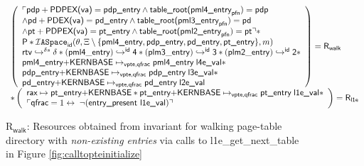 \begin{figure}\footnotesize
  \vspace{-1em}
$\begin{array}{l}\left( \begin{array}{l} \ulcorner \textsf{pdp}+\textsf{PDPEX(va)} = \textsf{pdp\_entry} \land \textsf{table\_root(pml4\_entry}_{\textsf{pfn}})  = \textsf{pdp} \\ \land \textsf{pd}+\textsf{PDEX(va)} = \textsf{pd\_entry} \land \textsf{table\_root(pml3\_entry}_{\textsf{pfn}})  = \textsf{pd} \\ \land \textsf{pt}+\textsf{PDPEX(va)} = \textsf{pt\_entry} \land \textsf{table\_root(pml2\_entry}_{\textsf{pfn}})  = \textsf{pt} \urcorner  \ast \\  \textsf{P} \ast \mathcal{I}\texttt{ASpace}_{\textsf{id}}(\theta,\Xi\setminus\{\textsf{pml4\_entry},\textsf{pdp\_entry},\textsf{pd\_entry},\textsf{pt\_entry}\},m)  \\ \ghostmaptoken{\delta{}s}{\rtv}{\delta} \ast  
      \ghostmaptoken{\textsf{id}}{(\mathsf{pml4\_entry})}{\textsf{4}}\ast \ghostmaptoken{\textsf{id}}{(\mathsf{plm3\_entry})}{\textsf{3}} \ast \ghostmaptoken{\textsf{id}}{(\mathsf{plm2\_entry})}{\textsf{2}}  \ast \\  \textsf{pml4\_entry+KERNBASE} \mapsto_{\textsf{vpte,qfrac}} \textsf{pml4\_entry} \; \textsf{l4e\_val}  \ast \\  \textsf{pdp\_entry+KERNBASE} \mapsto_{\textsf{vpte,qfrac}} \textsf{pdp\_entry}\;\textsf{l3e\_val}  \ast \\  \textsf{pd\_entry+KERNBASE} \mapsto_{\textsf{vpte,qfrac}} \textsf{pd\_entry} \; \textsf{l2e\_val}  \end{array} \right)  =\textsf{R}_{\textsf{walk} } 
    \\ \ast \left(\begin{array}{l} \textsf{rax} \mapsto \textsf{pt\_entry+KERNBASE} \ast  \textsf{pt\_entry+KERNBASE} \mapsto_{\textsf{vpte,qfrac}} \textsf{pt\_entry}\;\textsf{l1e\_val} \ast \\ \ulcorner  \textsf{qfrac} = 1 \leftrightarrow \; \lnot(\textsf{entry\_present l1e\_val})\urcorner \end{array}\right) =\textsf{R}_{\textsf{l1e}}\end{array} $
\caption{\textsf{R}$_{\textsf{walk}}$: Resources obtained from invariant for walking page-table directory with \emph{non-existing entries} via calls to \textsf{l1e\_get\_next\_table} in Figure \ref{fig:calltopteinitialize}}
\label{fig:rwalk}
\vspace{-1em}
\end{figure}
